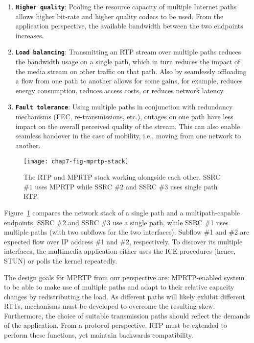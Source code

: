 \begin{enumerate}
\setlength{\itemsep}{5pt}

\item \textbf{\texttt{Higher quality}}: Pooling the resource capacity of
multiple Internet paths allows higher bit-rate and higher quality codecs to be
used. From the application perspective, the available bandwidth between the
two endpoints increases.

\item \textbf{\texttt{Load balancing}}: Transmitting an RTP stream over
multiple paths reduces the bandwidth usage on a single path, which in turn
reduces the impact of the media stream on other traffic on that path. Also by
seamlessly offloading a flow from one path to another allows for some gains,
for example, reduces energy consumption, reduces access costs, or reduces
network latency.

\item \textbf{\texttt{Fault tolerance}}: Using multiple paths in conjunction
with redundancy mechanisms (FEC, re-transmissions, etc.), outages on one path
have less impact on the overall perceived quality of the stream. This can also
enable seamless handover in the case of mobility, i.e., moving from one
network to another.

\end{enumerate}


\begin{figure}
\centerline {
\texttt{[image: chap7-fig-mprtp-stack]}
}
\caption{The RTP and MPRTP stack working alongside each other. SSRC $\#1$ uses
MPRTP while SSRC $\#2$ and SSRC $\#3$ uses single path RTP.}
\label{chap7:fig_mprtp_arch}
\end{figure}

Figure~\ref{chap7:fig_mprtp_arch} compares the network stack of a single path
and a multipath-capable endpoints. SSRC \#2 and SSRC \#3 use a single path,
while SSRC \#1 uses multiple paths (with two subflows for the two interfaces).
Subflow \#1 and \#2 are expected flow over IP address \#1 and \#2,
respectively. To discover its multiple interfaces, the multimedia application
either uses the ICE procedures (hence, STUN) or polls the kernel repeatedly.

The design goals for MPRTP from our perspective are: MPRTP-enabled system to
be able to make use of multiple paths and adapt to their relative capacity
changes by redistributing the load. As different paths will likely exhibit
different RTTs, mechanisms must be developed to overcome the resulting skew.
Furthermore, the choice of suitable transmission paths should reflect the
demands of the application. From a protocol perspective, RTP must be extended
to perform these functions, yet maintain backwards compatibility.


